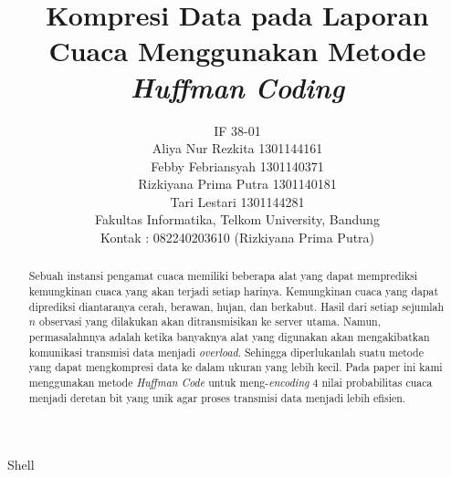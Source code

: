 \documentclass[journal]{IEEEtran}
\begin{document}
	
\title{Kompresi Data pada Laporan Cuaca Menggunakan Metode \textit{Huffman Coding}}

\author{
	IF 38-01\\
	\vspace{1mm}
	Aliya Nur Rezkita\hspace{1.05cm} 1301144161\\
	Febby Febriansyah\hspace{1cm} 1301140371\\	
	Rizkiyana Prima Putra\hspace{0.4cm} 1301140181\\
	Tari Lestari\hspace{2.15cm} 1301144281\\
	\vspace*{1mm}
	Fakultas Informatika, Telkom University, Bandung\\
	Kontak : 082240203610 (Rizkiyana Prima Putra)
}

%
{Shell}

\maketitle
\renewcommand{\abstractname}{Abstrak}
\begin{abstract}
Sebuah instansi pengamat cuaca memiliki beberapa alat yang dapat memprediksi kemungkinan cuaca yang akan terjadi setiap harinya. Kemungkinan cuaca yang dapat diprediksi diantaranya cerah, berawan, hujan, dan berkabut. Hasil dari setiap sejumlah $n$ observasi yang dilakukan akan ditransmisikan ke server utama. Namun, permasalahnnya adalah ketika banyaknya alat yang digunakan akan mengakibatkan komunikasi transmisi data menjadi \textit{overload}. Sehingga diperlukanlah suatu metode yang dapat mengkompresi data ke dalam ukuran yang lebih kecil. Pada paper ini kami menggunakan metode \textit{Huffman Code} untuk meng-\textit{encoding} 4 nilai probabilitas cuaca menjadi deretan bit yang unik agar proses transmisi data menjadi lebih efisien.
\end{abstract}
\end{document}
